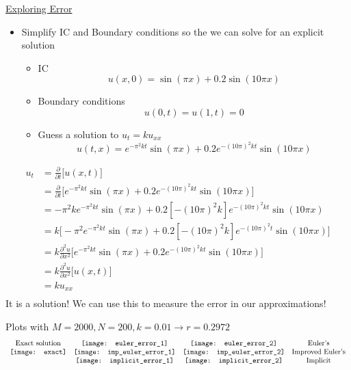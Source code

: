 \documentclass[compress]{beamer}
\begin{document}
\begin{frame}
\begin{center}
\underline{Exploring Error}
\end{center}
\begin{itemize}
\item Simplify IC and Boundary conditions so the we can solve for an explicit solution
\begin{itemize}
\item IC
$$u(x,0)=\sin (\pi x)+0.2\sin (10\pi x)$$
\item Boundary conditions 
$$u(0,t)=u(1,t)=0$$
\item Guess a solution to $u_t=ku_{xx}$ 
$$u(t,x)=e^{-\pi ^2kt}\sin(\pi x)+0.2e^{-(10\pi)^2kt}\sin(10\pi x)$$
\end{itemize}		
\end{itemize}
\end{frame}

\begin{frame}
\begin{align*}
u_t 	&=\frac{\partial}{\partial t}\Big[u(x,t)\Big]			\\
		&=	\frac{\partial}{\partial t}\Big[e^{-\pi ^2kt}\sin(\pi x)+0.2e^{-(10\pi)^2kt}\sin(10\pi x)\Big] 	\\
		&=	-\pi ^2ke^{-\pi ^2kt}\sin(\pi x)+0.2\left[-(10\pi)^2k\right]e^{-(10\pi)^2kt}\sin(10\pi x)					\\
		&=	k\Big[-\pi ^2e^{-\pi ^2kt}\sin(\pi x)+0.2\left[-(10\pi)^2k\right]e^{-(10\pi)^2t}\sin(10\pi x)\Big]		\\
		&=k\frac{\partial ^2u}{\partial x^2}\Big[e^{-\pi ^2kt}\sin(\pi x)+0.2e^{-(10\pi)^2kt}\sin(10\pi x)\Big]		\\
		&=k\frac{\partial ^2u}{\partial x^2}\Big[u(x,t)\Big]	\\
		&=ku_{xx}	 		\\
\end{align*}
It is a solution! We can use this to measure the error in our approximations!
\end{frame}

\begin{frame}
Plots with $M=2000, N=200, k=0.01 \rightarrow r=0.2972$
\[
\begin{array}{c c c c}
\text{Exact solution} 	&	\texttt{[image: euler\_error\_1]}	&	\texttt{[image: euler\_error\_2]}	&	\text{Euler's}	\\
\texttt{[image: exact]}				&	\texttt{[image: imp\_euler\_error\_1]}	&	\texttt{[image: imp\_euler\_error\_2]}	&	\text{Improved Euler's}		\\
									&	\texttt{[image: implicit\_error\_1]}	&	\texttt{[image: implicit\_error\_2]}	&\text{Implicit}					
\end{array}
\]
\end{frame}
\end{document}
